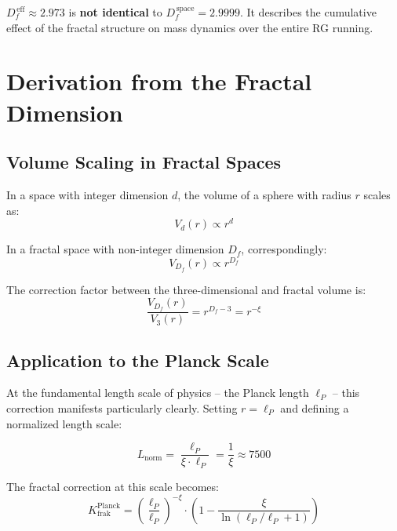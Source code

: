 	$D_f^{\,\text{eff}} \approx 2.973$ is \textbf{not identical} to $D_f^{\,\text{space}} = 2.9999$. It describes the cumulative effect of the fractal structure on mass dynamics over the entire RG running.
	
	\section{Derivation from the Fractal Dimension}
	
	\subsection{Volume Scaling in Fractal Spaces}
	
	In a space with integer dimension $d$, the volume of a sphere with radius $r$ scales as:
	\begin{equation}
		V_d(r) \propto r^d
	\end{equation}
	
	In a fractal space with non-integer dimension $D_f$, correspondingly:
	\begin{equation}
		V_{D_f}(r) \propto r^{D_f}
		\label{eq:fractal_volume}
	\end{equation}
	
	The correction factor between the three-dimensional and fractal volume is:
	\begin{equation}
		\frac{V_{D_f}(r)}{V_3(r)} = r^{D_f - 3} = r^{-\xi}
		\label{eq:volume_correction}
	\end{equation}
	
	\subsection{Application to the Planck Scale}
	
	At the fundamental length scale of physics – the Planck length $\ell_P$ – this correction manifests particularly clearly. Setting $r = \ell_P$ and defining a normalized length scale:
	
	\begin{equation}
		L_{\text{norm}} = \frac{\ell_P}{\xi \cdot \ell_P} = \frac{1}{\xi} \approx 7500
	\end{equation}
	
	The fractal correction at this scale becomes:
	\begin{equation}
		K_{\text{frak}}^{\text{Planck}} = \left(\frac{\ell_P}{\ell_P}\right)^{-\xi} \cdot \left(1 - \frac{\xi}{\ln(\ell_P/\ell_P + 1)}\right)
	\end{equation}
	
